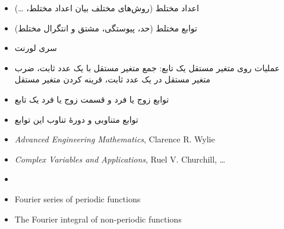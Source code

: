 {    \begin{itemize}
      \item اعداد مختلط (روش‌های مختلف بیان اعداد مختلط، \dots)
      \item توابع مختلط (حد، پیوستگی، مشتق و انتگرال مختلط)
      \item سری لورنت
    \end{itemize}
    \begin{itemize}
      \item عملیات روی متغیر مستقل یک تابع: جمع متغیر مستقل با یک عدد ثابت، ضرب متغیر مستقل در یک عدد ثابت، قرینه کردن متغیر مستقل
      \item توابع زوج یا فرد و قسمت زوج یا فرد یک تابع
      \item توابع متناوبی و دورهٔ تناوب این توابع
    \end{itemize}
  \else
    \begin{itemize}
      \item \textit{Advanced Engineering Mathematics}, Clarence R. Wylie
      \item \textit{Complex Variables and Applications}, Ruel V. Churchill, \dots
      \item {}
    \end{itemize}
    \noindent{}\hfill
    \hfill
    \hfill
    \par
    \begin{itemize}
      \item Fourier series of periodic functions
      \item The Fourier integral of non-periodic functions

\end{itemize}}
